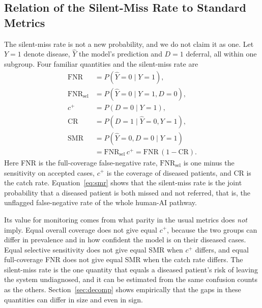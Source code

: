 \subsection{Relation of the Silent-Miss Rate to Standard Metrics}
\label{sec:metric}
The silent-miss rate is not a new probability, and we do not claim it as one. Let $Y=1$ denote disease, $\hat{Y}$ the model's prediction and $D=1$ deferral, all within one subgroup. Four familiar quantities and the silent-miss rate are
\begin{align}
\mathrm{FNR} &= P(\hat{Y}=0 \mid Y=1), \nonumber\\
\mathrm{FNR}_{\mathrm{sel}} &= P(\hat{Y}=0 \mid Y=1, D=0), \nonumber\\
c^{+} &= P(D=0 \mid Y=1), \nonumber\\
\mathrm{CR} &= P(D=1 \mid \hat{Y}=0, Y=1), \nonumber\\
\mathrm{SMR} &= P(\hat{Y}=0, D=0 \mid Y=1) \nonumber\\
 &= \mathrm{FNR}_{\mathrm{sel}}\, c^{+} = \mathrm{FNR}\,(1-\mathrm{CR}). \label{eq:smr}
\end{align}
Here FNR is the full-coverage false-negative rate, $\mathrm{FNR}_{\mathrm{sel}}$ is one minus the sensitivity on accepted cases, $c^{+}$ is the coverage of diseased patients, and CR is the catch rate. Equation~\eqref{eq:smr} shows that the silent-miss rate is the joint probability that a diseased patient is both missed and not referred, that is, the unflagged false-negative rate of the whole human-AI pathway.

Its value for monitoring comes from what parity in the usual metrics does \emph{not} imply. Equal overall coverage does not give equal $c^{+}$, because the two groups can differ in prevalence and in how confident the model is on their diseased cases. Equal selective sensitivity does not give equal SMR when $c^{+}$ differs, and equal full-coverage FNR does not give equal SMR when the catch rate differs. The silent-miss rate is the one quantity that equals a diseased patient's risk of leaving the system undiagnosed, and it can be estimated from the same confusion counts as the others. Section~\ref{sec:decomp} shows empirically that the gaps in these quantities can differ in size and even in sign.
